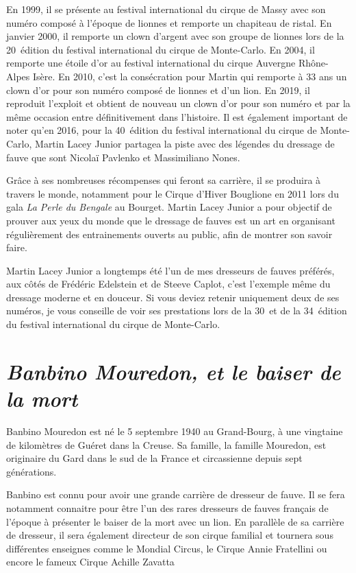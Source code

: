 En 1999, il se présente au festival international du cirque de Massy avec son numéro composé à l'époque de lionnes et remporte un chapiteau de ristal. En janvier 2000, il remporte un clown d'argent avec son groupe de lionnes lors de la 20\ieme~édition du festival international du cirque de Monte-Carlo. En 2004, il remporte une étoile d'or au festival international du cirque Auvergne Rhône-Alpes Isère. En 2010, c'est la consécration pour Martin qui remporte à 33 ans un clown d'or pour son numéro composé de lionnes et d’un lion. En 2019, il reproduit l'exploit et obtient de nouveau un clown d'or pour son numéro et par la même occasion entre définitivement dans l'histoire. Il est également important de noter qu'en 2016, pour la 40\ieme~édition du festival international du cirque de Monte-Carlo, Martin Lacey Junior partagea la piste avec des légendes du dressage de fauve que sont Nicolaï Pavlenko et Massimiliano Nones.

Grâce à ses nombreuses récompenses qui feront sa carrière, il se produira à travers le monde, notamment pour le Cirque d'Hiver Bouglione en 2011 lors du gala \textit{La Perle du Bengale} au Bourget. Martin Lacey Junior a pour objectif de prouver aux yeux du monde que le dressage de fauves est un art en organisant régulièrement des entrainements ouverts au public, afin de montrer son savoir faire.

Martin Lacey Junior a longtemps été l'un de mes dresseurs de fauves préférés, aux côtés de Frédéric Edelstein et de Steeve Caplot, c'est l'exemple même du dressage moderne et en douceur. Si vous deviez retenir uniquement deux de ses numéros, je vous conseille de voir ses prestations lors de la 30\ieme~et de la 34\ieme~édition du festival international du cirque de Monte-Carlo.

\section*{\textit{Banbino Mouredon, et le baiser de la mort}}
{}

Banbino Mouredon est né le 5 septembre 1940 au Grand-Bourg, à une vingtaine de kilomètres de Guéret dans la Creuse. Sa famille, la famille Mouredon, est originaire du Gard dans le sud de la France et circassienne depuis sept générations.

Banbino est connu pour avoir une grande carrière de dresseur de fauve. Il se fera notamment connaitre pour être l'un des rares dresseurs de fauves français de l'époque à présenter le baiser de la mort avec un lion. En parallèle de sa carrière de dresseur, il sera également directeur de son cirque familial et tournera sous différentes enseignes comme le Mondial Circus, le Cirque Annie Fratellini ou encore le fameux Cirque Achille Zavatta

